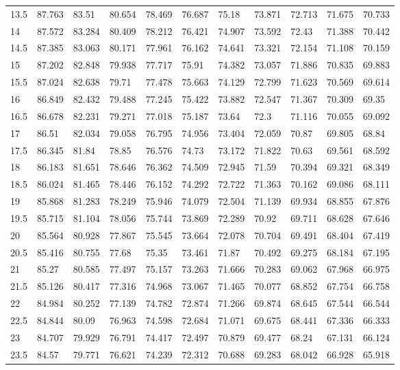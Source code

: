 \begin{bibunit}
\begin{table}[]
\begin{tabular}{lllllllllll}
			13.5 & 87.763 & 83.51  & 80.654 & 78.469 & 76.687 & 75.18  & 73.871 & 72.713 & 71.675 & 70.733 \\
			14   & 87.572 & 83.284 & 80.409 & 78.212 & 76.421 & 74.907 & 73.592 & 72.43  & 71.388 & 70.442 \\
			14.5 & 87.385 & 83.063 & 80.171 & 77.961 & 76.162 & 74.641 & 73.321 & 72.154 & 71.108 & 70.159 \\
			15   & 87.202 & 82.848 & 79.938 & 77.717 & 75.91  & 74.382 & 73.057 & 71.886 & 70.835 & 69.883 \\
			15.5 & 87.024 & 82.638 & 79.71  & 77.478 & 75.663 & 74.129 & 72.799 & 71.623 & 70.569 & 69.614 \\
			16   & 86.849 & 82.432 & 79.488 & 77.245 & 75.422 & 73.882 & 72.547 & 71.367 & 70.309 & 69.35  \\
			16.5 & 86.678 & 82.231 & 79.271 & 77.018 & 75.187 & 73.64  & 72.3   & 71.116 & 70.055 & 69.092 \\
			17   & 86.51  & 82.034 & 79.058 & 76.795 & 74.956 & 73.404 & 72.059 & 70.87  & 69.805 & 68.84  \\
			17.5 & 86.345 & 81.84  & 78.85  & 76.576 & 74.73  & 73.172 & 71.822 & 70.63  & 69.561 & 68.592 \\
			18   & 86.183 & 81.651 & 78.646 & 76.362 & 74.509 & 72.945 & 71.59  & 70.394 & 69.321 & 68.349 \\
			18.5 & 86.024 & 81.465 & 78.446 & 76.152 & 74.292 & 72.722 & 71.363 & 70.162 & 69.086 & 68.111 \\
			19   & 85.868 & 81.283 & 78.249 & 75.946 & 74.079 & 72.504 & 71.139 & 69.934 & 68.855 & 67.876 \\
			19.5 & 85.715 & 81.104 & 78.056 & 75.744 & 73.869 & 72.289 & 70.92  & 69.711 & 68.628 & 67.646 \\
			20   & 85.564 & 80.928 & 77.867 & 75.545 & 73.664 & 72.078 & 70.704 & 69.491 & 68.404 & 67.419 \\
			20.5 & 85.416 & 80.755 & 77.68  & 75.35  & 73.461 & 71.87  & 70.492 & 69.275 & 68.184 & 67.195 \\
			21   & 85.27  & 80.585 & 77.497 & 75.157 & 73.263 & 71.666 & 70.283 & 69.062 & 67.968 & 66.975 \\
			21.5 & 85.126 & 80.417 & 77.316 & 74.968 & 73.067 & 71.465 & 70.077 & 68.852 & 67.754 & 66.758 \\
			22   & 84.984 & 80.252 & 77.139 & 74.782 & 72.874 & 71.266 & 69.874 & 68.645 & 67.544 & 66.544 \\
			22.5 & 84.844 & 80.09  & 76.963 & 74.598 & 72.684 & 71.071 & 69.675 & 68.441 & 67.336 & 66.333 \\
			23   & 84.707 & 79.929 & 76.791 & 74.417 & 72.497 & 70.879 & 69.477 & 68.24  & 67.131 & 66.124 \\
			23.5 & 84.57  & 79.771 & 76.621 & 74.239 & 72.312 & 70.688 & 69.283 & 68.042 & 66.928 & 65.918 \\
			

\end{tabular}
\end{table}
\end{bibunit}
